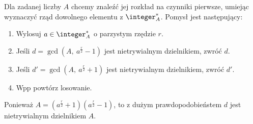 Dla zadanej liczby \( A \) chcemy znaleźć jej rozkład na czynniki pierwsze, umiejąc wyznaczyć rząd dowolnego elementu z \( \integer_A^* \).
Pomysł jest następujący:
\begin{greyframe}
    \begin{enumerate}
        \item Wylosuj \( a \in \integer_A^* \) o parzystym rzędzie \( r \).
        \item Jeśli \( d = \gcd(A, \ a^{\frac{r}{2}} - 1) \) jest nietrywialnym dzielnikiem, zwróć \(d\).
        \item Jeśli \( d' = \gcd(A, \ a^{\frac{r}{2}} + 1) \) jest nietrywialnym dzielnikiem, zwróć \(d'\).
        \item Wpp powtórz losowanie.
    \end{enumerate}
\end{greyframe}
Ponieważ \( A = (a^{\frac{r}{2}} + 1) (a^{\frac{r}{2}} - 1) \), to z dużym prawdopodobieństem \( d \) jest nietrywialnym dzielnikiem \( A \).

